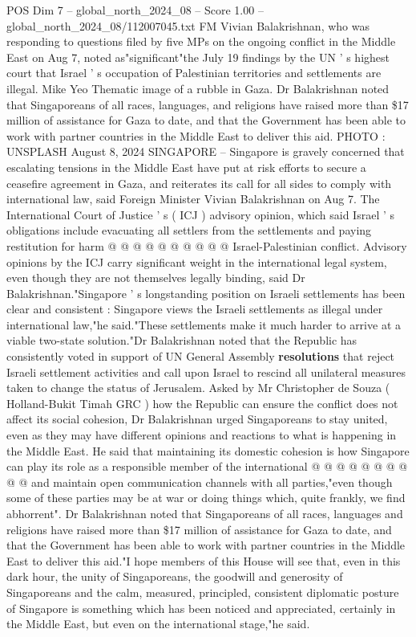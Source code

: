 \begin{textsample}{POS Dim 7 – global\_north\_2024\_08 – Score 1.00 – global\_north\_2024\_08/112007045.txt}  \label{ex:f7_pos_367}
FM Vivian Balakrishnan, who was responding to questions filed by five MPs on the ongoing conflict in the Middle East on Aug 7, noted as"significant"the July 19 findings by the UN ' s highest court that Israel ' s occupation of Palestinian territories and settlements are illegal.
Mike Yeo Thematic image of a rubble in Gaza.
Dr Balakrishnan noted that Singaporeans of all races, languages, and religions have raised more than \$17 million of assistance for Gaza to date, and that the Government has been able to work with partner countries in the Middle East to deliver this aid.
PHOTO : UNSPLASH August 8, 2024 SINGAPORE -- Singapore is gravely concerned that escalating tensions in the Middle East have put at risk efforts to secure a ceasefire agreement in Gaza, and reiterates its call for all sides to comply with international law, said Foreign Minister Vivian Balakrishnan on Aug 7.
The International Court of Justice ' s ( ICJ ) advisory opinion, which said Israel ' s obligations include evacuating all settlers from the settlements and paying restitution for harm @ @ @ @ @ @ @ @ @ @ Israel-Palestinian conflict.
Advisory opinions by the ICJ carry significant weight in the international legal system, even though they are not themselves legally binding, said Dr Balakrishnan."Singapore ' s longstanding position on Israeli settlements has been clear and consistent : Singapore views the Israeli settlements as illegal under international law,"he said."These settlements make it much harder to arrive at a viable two-state solution."Dr Balakrishnan noted that the Republic has consistently voted in support of UN General Assembly \textbf{resolutions} that reject Israeli settlement activities and call upon Israel to rescind all unilateral measures taken to change the status of Jerusalem.
Asked by Mr Christopher de Souza ( Holland-Bukit Timah GRC ) how the Republic can ensure the conflict does not affect its social cohesion, Dr Balakrishnan urged Singaporeans to stay united, even as they may have different opinions and reactions to what is happening in the Middle East.
He said that maintaining its domestic cohesion is how Singapore can play its role as a responsible member of the international @ @ @ @ @ @ @ @ @ @ and maintain open communication channels with all parties,"even though some of these parties may be at war or doing things which, quite frankly, we find abhorrent".
Dr Balakrishnan noted that Singaporeans of all races, languages and religions have raised more than \$17 million of assistance for Gaza to date, and that the Government has been able to work with partner countries in the Middle East to deliver this aid."I hope members of this House will see that, even in this dark hour, the unity of Singaporeans, the goodwill and generosity of Singaporeans and the calm, measured, principled, consistent diplomatic posture of Singapore is something which has been noticed and appreciated, certainly in the Middle East, but even on the international stage,"he said.

\end{textsample}
